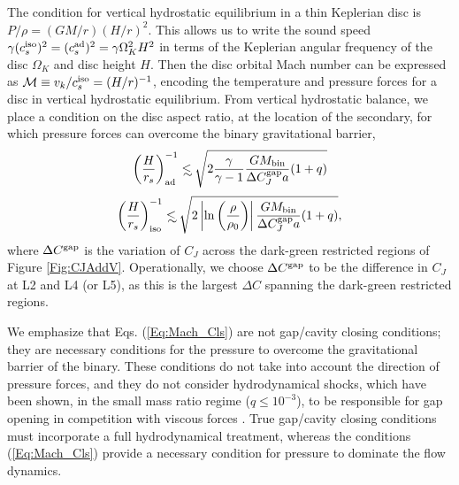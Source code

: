 The condition for vertical hydrostatic equilibrium in a thin Keplerian
disc is $P/\rho = (GM/r)(H/r)^2$. This allows us to write the sound
speed $\gamma(c^{\rm{iso}}_s)^2 = (c^{\rm{ad}}_s)^2 = \gamma
\Omega^2_K H^2$ in terms of the Keplerian angular frequency of the disc
$\Omega_K$ and disc height $H$. Then the disc orbital Mach number can
be expressed as $\mathcal{M} \equiv v_k/c^{\rm{iso}}_s =
(H/r)^{-1}$, encoding the temperature and pressure forces for a disc in vertical 
hydrostatic equilibrium. From vertical hydrostatic balance, we place a condition on the disc aspect ratio, at the location of the secondary, for which pressure forces can overcome the binary gravitational barrier, 
\[
\nonumber 
\left(\frac{H}{r_s} \right)^{-1}_{\rm{ad}}  \lsim  \sqrt{2 \frac{\gamma}{\gamma-1} \frac{GM_{\bin}}{ \Delta C^{\rm{gap}}_J  a} (1+q) } \nonumber 
\]
%
\begin{equation}
\left(\frac{H}{r_s} \right)^{-1}_{\rm{iso}}  \lsim  \sqrt{2 \left| \ln{\left( \frac{\rho}{\rho_0}\right)} \right| \frac{GM_{\bin}}{ \Delta C^{\rm{gap}}_J a} (1+q) },
\label{Eq:Mach_Cls}
\end{equation}
where $\Delta C^{\rm{gap}}$ is the variation of $C_J$ across the
dark-green restricted regions of Figure
\ref{Fig:CJAddV}. Operationally, we choose $\Delta C^{\rm{gap}}$ to be
the difference in $C_J$ at L2 and L4 (or L5), as this is the largest
$\Delta C$ spanning the dark-green restricted regions.

We emphasize that Eqs. (\ref{Eq:Mach_Cls}) are not gap/cavity closing conditions; 
they are necessary conditions for the pressure to overcome the gravitational barrier of the binary. These conditions do not take into account the direction of pressure forces, and they do not consider hydrodynamical shocks, which have been shown, in the small mass ratio regime ($q\leq 10^{-3}$), to be responsible for gap opening in competition with viscous forces \citep{DongRafI:2011, DongRafII:2011, DuffellMac:2013:smallqGapOpen, FungGaps:2014, DuffellGapAnyl:2015}. 
True gap/cavity closing conditions must incorporate a full hydrodynamical treatment, whereas the conditions (\ref{Eq:Mach_Cls}) provide a necessary condition for pressure to dominate the flow dynamics.

